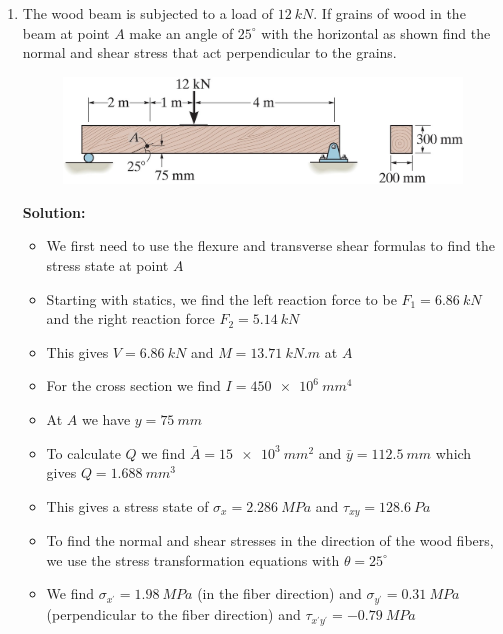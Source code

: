 \documentclass[12pt, oneside]{article}
\begin{document}
\begin{enumerate}
	\item %
		The wood beam is subjected to a load of $ 	\SI{12 }{kN}  $.
		If grains of wood in the beam at point $A$ make an angle of $25^\circ$ with the horizontal as shown find the normal and shear stress that act perpendicular to the grains.
		\begin{figure}[H]
			\centering
			\includegraphics[width=0.8\linewidth]{9-24}
		\end{figure}
			\textbf{Solution:}
			\begin{itemize}
				\item We first need to use the flexure and transverse shear formulas to find the stress state at point $A$
				\item Starting with statics, we find the left reaction force to be $F_1 = 	\SI{6.86}{kN} $ and the right reaction force $F_2 = 	\SI{5.14}{kN} $
				\item This gives $V = 	\SI{6.86}{kN} $ and $M = 	\SI{13.71}{kN.m} $ at $A$
				\item For the cross section we find $I = 	\SI{450e6}{mm^4} $
				\item At $A$ we have $y = 	\SI{75}{mm} $
				\item To calculate $Q$ we find $\bar{A} = 	\SI{15e3}{mm^2} $ and $\bar{y} = 	\SI{112.5 }{mm} $ which gives $Q = 	\SI{1.688}{mm^3} $
				\item This gives a stress state of $\sigma_x = 	\SI{2.286}{MPa} $ and $\tau_{xy} = 	\SI{128.6 }{Pa} $
				\item To find the normal and shear stresses in the direction of the wood fibers, we use the stress transformation equations with $\theta = 25^\circ$
				\item We find $\sigma_{x^\prime} = 	\SI{1.98}{MPa} $ (in the fiber direction) and $\sigma_{y^\prime} = 	\SI{0.31}{MPa} $ (perpendicular to the fiber direction) and $\tau_{x^\prime y^\prime} = 	\SI{-0.79}{MPa} $
			\end{itemize}


\end{enumerate}
\end{document}

